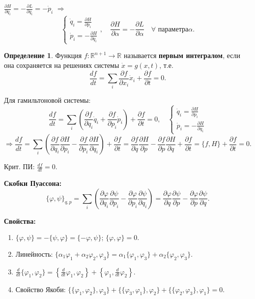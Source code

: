 \documentclass[12pt, a4paper]{article}
\theoremstyle{plain}
\theoremstyle{definition}
\newtheorem{definition}{Определение}[section]
\theoremstyle{remark}
\begin{document}
$\frac{\partial H}{\partial q_i} = -\frac{\partial L}{\partial q_i} = -\dot{p}_i$ $\Rightarrow$ 
\[
\begin{cases}
\dot{q}_i = \frac{\partial H}{\partial p_i} \\
\dot{p}_i = -\frac{\partial H}{\partial q_i}
\end{cases}, \quad \frac{\partial H}{\partial \alpha} = -\frac{\partial L}{\partial \alpha} \quad \forall \text{ параметра} \alpha.
\]

\begin{definition}
Функция $f: \mathbb{R}^{n+1} \to \mathbb{R}$ называется \textbf{первым интегралом}, если она сохраняется на решениях системы $\dot{x} = g(x, t)$, т.е.
\[
\frac{df}{dt} = \sum_i \frac{\partial f}{\partial x_i} \dot{x}_i + \frac{\partial f}{\partial t} = 0.
\]    
\end{definition}


Для гамильтоновой системы:
\[
\frac{df}{dt} = \sum_i \left(\frac{\partial f}{\partial q_i} \dot{q}_i + \frac{\partial f}{\partial p_i} \dot{p}_i\right) + \frac{\partial f}{\partial t} = 0, \quad 
\begin{cases}
\dot{q}_i = \frac{\partial H}{\partial p_i} \\
\dot{p}_i = -\frac{\partial H}{\partial q_i}
\end{cases}
\]
\[
\Rightarrow \frac{df}{dt} = \sum_i \left(\frac{\partial f}{\partial q_i} \frac{\partial H}{\partial p_i} - \frac{\partial f}{\partial p_i} \frac{\partial H}{\partial q_i}\right) + \frac{\partial f}{\partial t} = \frac{\partial f}{\partial q} \frac{\partial H}{\partial p} - \frac{\partial f}{\partial p} \frac{\partial H}{\partial q} + \frac{\partial f}{\partial t} = \{f, H\} + \frac{\partial f}{\partial t} = 0.
\]

Крит. ПИ: $\frac{df}{dt} = 0$.

\textbf{Скобки Пуассона:}
\[
\{\varphi, \psi\}_{q,p} = \sum_i \left(\frac{\partial \varphi}{\partial q_i} \frac{\partial \psi}{\partial p_i} - \frac{\partial \varphi}{\partial p_i} \frac{\partial \psi}{\partial q_i}\right) = \frac{\partial \varphi}{\partial q} \frac{\partial \psi}{\partial p} - \frac{\partial \varphi}{\partial p} \frac{\partial \psi}{\partial q}.
\]

\textbf{Свойства:}
\begin{enumerate}
    \item $\{\varphi, \psi\} = -\{\psi, \varphi\} = \{-\varphi, \psi\}$; \quad $\{\varphi, \varphi\} = 0$.
    \item Линейность: $\{\alpha_1 \varphi_1 + \alpha_2 \varphi_2, \varphi_3\} = \alpha_1 \{\varphi_1, \varphi_3\} + \alpha_2 \{\varphi_2, \varphi_3\}$.
    \item $\frac{d}{dt} \{\varphi_1, \varphi_2\} = \left\{\frac{d}{dt} \varphi_1, \varphi_2\right\} + \left\{\varphi_1, \frac{d}{dt} \varphi_2\right\}$.
    \item Свойство Якоби: $\{\{\varphi_1, \varphi_2\}, \varphi_3\} + \{\{\varphi_3, \varphi_1\}, \varphi_2\} + \{\{\varphi_2, \varphi_3\}, \varphi_1\} = 0$.
\end{enumerate}
\end{document}
